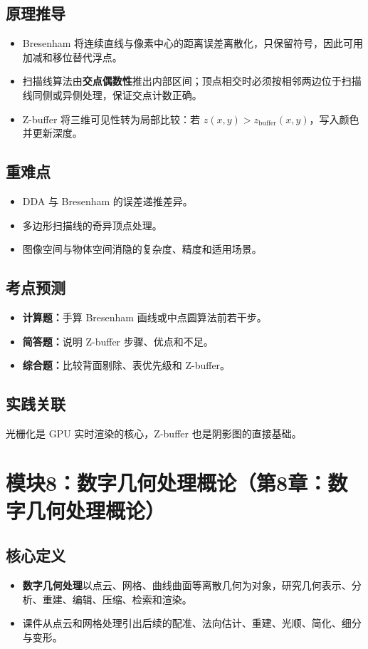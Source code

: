 \documentclass[UTF8,fontset=fandol,11pt]{ctexart}
\newcommand{\key}[1]{\textbf{#1}}
\newcommand{\exam}[1]{\textcolor{blue!55!black}{\textbf{#1}}}
\begin{document}
\subsection{原理推导}
\begin{itemize}
  \item Bresenham 将连续直线与像素中心的距离误差离散化，只保留符号，因此可用加减和移位替代浮点。
  \item 扫描线算法由\key{交点偶数性}推出内部区间；顶点相交时必须按相邻两边位于扫描线同侧或异侧处理，保证交点计数正确。
  \item Z-buffer 将三维可见性转为局部比较：若 $z(x,y)>z_{\text{buffer}}(x,y)$，写入颜色并更新深度。
\end{itemize}
\subsection{重难点}
\begin{itemize}
  \item DDA 与 Bresenham 的误差递推差异。
  \item 多边形扫描线的奇异顶点处理。
  \item 图像空间与物体空间消隐的复杂度、精度和适用场景。
\end{itemize}
\subsection{考点预测}
\begin{itemize}
  \item \exam{计算题：}手算 Bresenham 画线或中点圆算法前若干步。
  \item \exam{简答题：}说明 Z-buffer 步骤、优点和不足。
  \item \exam{综合题：}比较背面剔除、表优先级和 Z-buffer。
\end{itemize}
\subsection{实践关联}
光栅化是 GPU 实时渲染的核心，Z-buffer 也是阴影图的直接基础。

\section{模块8：数字几何处理概论（第8章：数字几何处理概论）}
\subsection{核心定义}
\begin{itemize}
  \item \key{数字几何处理}以点云、网格、曲线曲面等离散几何为对象，研究几何表示、分析、重建、编辑、压缩、检索和渲染。
  \item 课件从点云和网格处理引出后续的配准、法向估计、重建、光顺、简化、细分与变形。
\end{itemize}
\end{document}
